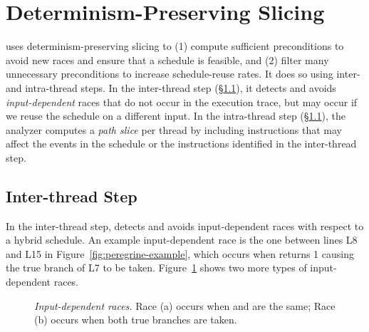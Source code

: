 \section{Determinism-Preserving Slicing} \label{sec:peregrine-slice}

\peregrine uses determinism-preserving slicing to (1) compute sufficient
preconditions to avoid new races and ensure that a schedule is feasible,
and (2) filter many unnecessary preconditions to increase schedule-reuse
rates.  It does so using inter- and intra-thread steps.  In the
inter-thread step (\S\ref{sec:peregrine-interthread-slice}), it detects and avoids
\emph{input-dependent} races that do not occur in the execution trace, but
may occur if we reuse the schedule on a different input.
In the intra-thread step (\S\ref{sec:peregrine-interthread-slice}), the analyzer
computes a \emph{path slice} per thread by including instructions that may
affect the events in the schedule or the instructions identified in the
inter-thread step.


\subsection{Inter-thread Step} \label{sec:peregrine-interthread-slice}

In the inter-thread step, \peregrine detects and avoids input-dependent races
with respect to a hybrid schedule.  An example input-dependent race is the
one between lines L8 and L15 in Figure~\ref{fig:peregrine-example}, which occurs when
 returns 1 causing the true branch of L7 to be taken.
Figure~\ref{fig:peregrine-input-race-examples} shows two more types of input-dependent races.

\begin{figure}[b]
\vspace{-.1in}
\centering
{}
\begin{minipage}[b]{.225\textwidth}
\end{minipage}
\begin{minipage}[b]{.225\textwidth}
\end{minipage}
\vspace{-.1in}
\caption{{\em Input-dependent races.} Race (a) occurs when
   and  are the same; Race (b) occurs when
  both true branches are taken.} \label{fig:peregrine-input-race-examples}
\end{figure}

